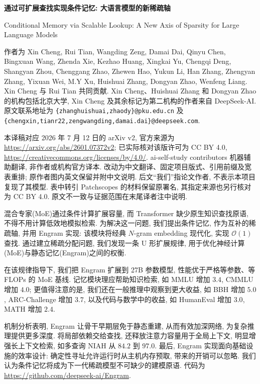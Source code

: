 \label{engram-paper}
\begin{center}
{\bfseries 通过可扩展查找实现条件记忆: 大语言模型的新稀疏轴}\par
Conditional Memory via Scalable Lookup: A New Axis of Sparsity for Large Language Models
\end{center}
作者为 Xin Cheng, Rui Tian, Wangding Zeng, Damai Dai, Qinyu Chen, Bingxuan Wang, Zhenda Xie, Kezhao Huang, Xingkai Yu, Chengqi Deng, Shangyan Zhou, Chenggang Zhao, Zhewen Hao, Yukun Li, Han Zhang, Zhengyan Zhang, Yixuan Wei, M.Y Xu, Huishuai Zhang, Dongyan Zhao, Wenfeng Liang. Xin Cheng 与 Rui Tian 共同贡献. Xin Cheng、Huishuai Zhang 和 Dongyan Zhao 的机构包括北京大学, Xin Cheng 及其余标记为第二机构的作者来自 DeepSeek-AI. 原文联系地址为 \texttt{\{zhanghuishuai,zhaody\}@pku.edu.cn} 及 \texttt{\{chengxin,tianr22,zengwangding,damai.dai\}@deepseek.com}.

\begin{remark}
本译稿对应 2026 年 7 月 12 日的 arXiv v2, 官方来源为 \url{https://arxiv.org/abs/2601.07372v2}; 已实际核对该版许可为 CC BY 4.0, \url{https://creativecommons.org/licenses/by/4.0/}. ai-self-study contributors 机器辅助翻译, 非作者或机构官方译本. 改动为中文翻译、固定项目版式、引用前缀及宽表重排; 原作者图内英文保留并附中文说明. 后文“我们”指论文作者, 不表示本项目复现了其模型. 表中转引 Patchscopes 的材料保留原署名, 其指定来源也另行核对为 CC BY 4.0. 原文不一致与证据范围在末尾译者注中说明.
\end{remark}

\label{engram-abstract}
混合专家(MoE)通过条件计算扩展容量, 而 Transformer 缺少原生知识查找原语, 不得不用计算低效地模拟检索. 为解决这一问题, 我们提出条件记忆, 作为互补的稀疏轴, 并用 Engram 实现: 该模块将经典 $N$-gram embedding 现代化, 实现 $\mathcal O(1)$ 查找. 通过建立稀疏分配问题, 我们发现一条 U 形扩展规律, 用于优化神经计算(MoE)与静态记忆(Engram)之间的权衡.

在该规律指导下, 我们把 Engram 扩展到 27B 参数模型, 性能优于严格等参数、等 FLOPs 的 MoE 基线. 记忆模块理应帮助知识检索, 如 MMLU 增加 $3.4$, CMMLU 增加 $4.0$; 更值得注意的是, 我们还在一般推理中观察到更大收益, 如 BBH 增加 $5.0$, ARC-Challenge 增加 $3.7$, 以及代码与数学中的收益, 如 HumanEval 增加 $3.0$, MATH 增加 $2.4$.

机制分析表明, Engram 让骨干早期层免于静态重建, 从而有效加深网络, 为复杂推理提供更多深度. 将局部依赖交给查找, 还释放注意力容量用于全局上下文, 明显增强长上下文检索, 如多查询 NIAH 从 $84.2$ 到 $97.0$. 最后, Engram 实现面向基础设施的效率设计: 确定性寻址允许运行时从主机内存预取, 带来的开销可以忽略. 我们认为条件记忆将成为下一代稀疏模型不可缺少的建模原语. 代码为 \url{https://github.com/deepseek-ai/Engram}.

